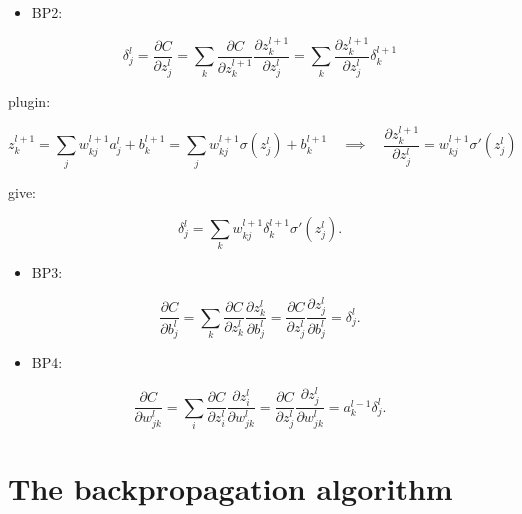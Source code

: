 \documentclass[]{book}
\providecommand{\tightlist}{%
  \setlength{\itemsep}{0pt}\setlength{\parskip}{0pt}}
\begin{document}
\begin{itemize}
\tightlist
\item
  BP2:
\end{itemize}

\begin{equation}  
\delta^l_j = \frac{\partial C}{\partial z^l_j}
           = \sum_k \frac{\partial C}{\partial z^{l+1}_k} \frac{\partial z^{l+1}_k}{\partial z^l_j} 
           = \sum_k \frac{\partial z^{l+1}_k}{\partial z^l_j} \delta^{l+1}_k
\end{equation}

plugin:

\begin{equation}
z^{l+1}_k = \sum_j w^{l+1}_{kj} a^l_j +b^{l+1}_k = \sum_j w^{l+1}_{kj} \sigma(z^l_j) +b^{l+1}_k 
\quad \implies \quad 
\frac{\partial z^{l+1}_k}{\partial z^l_j} = w^{l+1}_{kj} \sigma'(z^l_j)
\end{equation}

give:

\begin{equation}
\delta^l_j = \sum_k w^{l+1}_{kj}  \delta^{l+1}_k \sigma'(z^l_j).
\end{equation}

\begin{itemize}
\tightlist
\item
  BP3:
\end{itemize}

\begin{equation}
\displaystyle \frac{\partial C}{\partial b^l_j} 
  = \sum_k \frac{\partial C}{\partial z^l_k} \frac{\partial z^l_k}{\partial b^l_j}
  = \frac{\partial C}{\partial z^l_j} \frac{\partial z^l_j}{\partial b^l_j}
  = \delta^l_j.
\end{equation}

\begin{itemize}
\tightlist
\item
  BP4:
\end{itemize}

\begin{equation}
\displaystyle \frac{\partial C}{\partial w^l_{jk}} 
  = \sum_i \frac{\partial C}{\partial z^l_i} \frac{\partial z^l_i}{\partial w^l_{jk}}
  = \frac{\partial C}{\partial z^l_j} \frac{\partial z^l_j}{\partial w^l_{jk}}
  = a^{l-1}_k \delta^l_j.
\end{equation}

\section{The backpropagation
algorithm}\label{the-backpropagation-algorithm}
\end{document}

